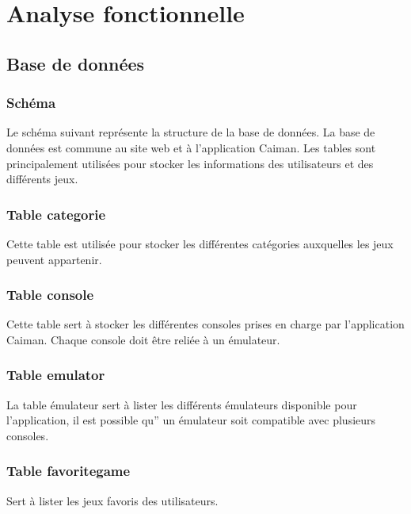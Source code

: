 \documentclass[a4paper,12pt,french]{sphinxmanual}
\begin{document}
\chapter{Analyse fonctionnelle}
\label{\detokenize{fonctionnelleBDD:analyse-fonctionnelle}}\label{\detokenize{fonctionnelleBDD::doc}}

\section{Base de données}
\label{\detokenize{fonctionnelleBDD:base-de-donnees}}

\subsection{Schéma}
\label{\detokenize{fonctionnelleBDD:schema}}
\sphinxAtStartPar
Le schéma suivant représente la structure de la base de données. La base de données est commune au site web et à l’application Caiman. Les tables sont principalement utilisées pour stocker les informations des utilisateurs et des différents jeux.

\sphinxAtStartPar
{}


\subsection{Table categorie}
\label{\detokenize{fonctionnelleBDD:table-categorie}}
\sphinxAtStartPar
Cette table est utilisée pour stocker les différentes catégories auxquelles les jeux peuvent appartenir.


\subsection{Table console}
\label{\detokenize{fonctionnelleBDD:table-console}}
\sphinxAtStartPar
Cette table sert à stocker les différentes consoles prises en charge par l’application Caiman. Chaque console doit être reliée à un émulateur.


\subsection{Table emulator}
\label{\detokenize{fonctionnelleBDD:table-emulator}}
\sphinxAtStartPar
La table émulateur sert à lister les différents émulateurs disponible pour l’application, il est possible qu” un émulateur soit compatible avec plusieurs consoles.


\subsection{Table favoritegame}
\label{\detokenize{fonctionnelleBDD:table-favoritegame}}
\sphinxAtStartPar
Sert à lister les jeux favoris des utilisateurs.
\end{document}
